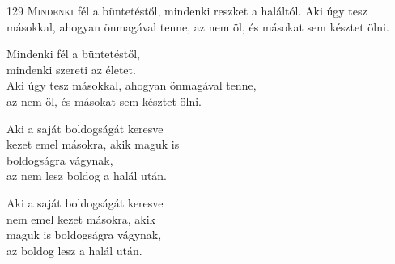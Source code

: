 
\vspace*{-\baselineskip}

\begin{firstdhpverse}[-8pt]{129}
\lettrine{M}{indenki} {\LettrineTextFont fél a büntetéstől,}\newline
mindenki reszket a haláltól.\newline
Aki úgy tesz másokkal,\newline
ahogyan önmagával tenne,\newline
az nem öl, és másokat sem késztet ölni.
\end{firstdhpverse}

\begin{dhpverse}

 Mindenki fél a büntetéstől,\\
mindenki szereti az életet.\\
Aki úgy tesz másokkal, ahogyan önmagával tenne,\\
az nem öl, és másokat sem késztet ölni.

 Aki a saját boldogságát keresve\\
kezet emel másokra, akik maguk is\\
boldogságra vágynak,\\
az nem lesz boldog a halál után.

 Aki a saját boldogságát keresve\\
nem emel kezet másokra, akik\\
maguk is boldogságra vágynak,\\
az boldog lesz a halál után.

\end{dhpverse}
\newpage
